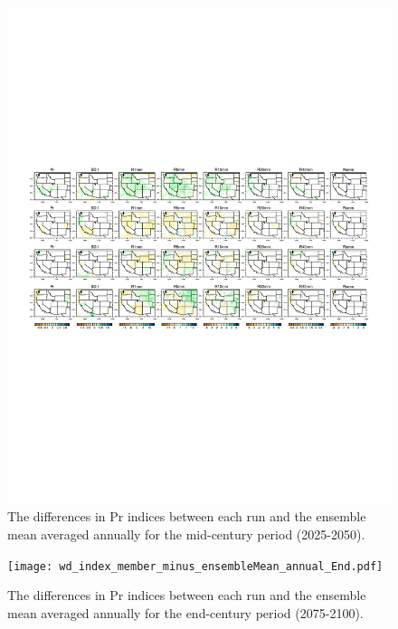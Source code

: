 \documentclass{ametsoc}
\begin{document}
\begin{figure}
\begin{center}
\includegraphics[width=6in]{wd_index_member_minus_ensembleMean_annual_Mid.pdf}
\caption{The differences in Pr indices between each run and the ensemble mean averaged annually for the mid-century period (2025-2050).}
\label{fig:S2}
\end{center}
\end{figure}

\begin{figure}
\begin{center}
\texttt{[image: wd\_index\_member\_minus\_ensembleMean\_annual\_End.pdf]}
\caption{The differences in Pr indices between each run and the ensemble mean averaged annually for the end-century period (2075-2100).}
\label{fig:S3}
\end{center}
\end{figure}

\end{document}

